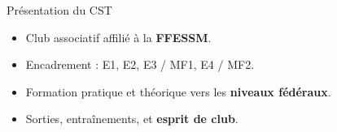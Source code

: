 \begin{frame}{Présentation du CST}
  \begin{itemize}
    \item Club associatif affilié à la \textbf{FFESSM}.
    \item Encadrement : E1, E2, E3 / MF1, E4 / MF2.
    \item Formation pratique et théorique vers les \textbf{niveaux fédéraux}.
    \item Sorties, entraînements, et \textbf{esprit de club}.
  \end{itemize}
\end{frame}
